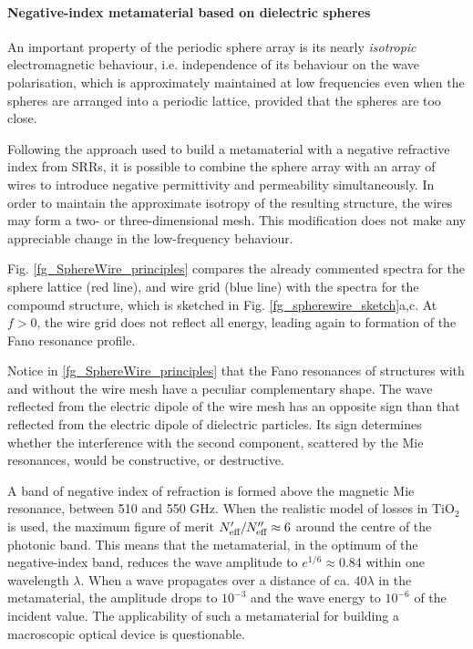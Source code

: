 \paragraph{Negative-index metamaterial based on dielectric spheres} %
An important property of the periodic sphere array is its nearly \textit{isotropic} electromagnetic behaviour, i.e. independence of its behaviour on the wave polarisation, which is approximately maintained at low frequencies even when the spheres are arranged into a periodic lattice, provided that the spheres are too close. 

Following the approach used to build a metamaterial with a negative refractive index from SRRs, it is possible to combine the sphere array with an array of wires to introduce negative permittivity and permeability simultaneously. In order to maintain the approximate isotropy of the resulting structure, the wires may form a two- or three-dimensional mesh. This modification does not make any appreciable change in the low-frequency behaviour. %

Fig. \ref{fg_SphereWire_principles} compares the already commented spectra for the sphere lattice (red line), and wire grid (blue line) with the spectra for the compound structure, which is sketched in Fig. \ref{fg_spherewire_sketch}a,c. At $f>0$, the wire grid does not reflect all energy, leading again to formation of the Fano resonance profile. 

Notice in \ref{fg_SphereWire_principles} that the Fano resonances of structures with and without the wire mesh have a peculiar complementary shape. The wave reflected from the electric dipole of the wire mesh has an opposite sign than that reflected from the electric dipole of dielectric particles. Its sign determines whether the interference with the second component, scattered by the Mie resonances, would be constructive, or destructive. 

A band of negative index of refraction is formed above the magnetic Mie resonance, between 510 and 550 GHz. When the realistic model of losses in TiO$_2$ is used, the maximum figure of merit $N_{\text{eff} }'/N_{\text{eff} }'' \approx 6$ around the centre of the photonic band. This means that the metamaterial, in the optimum of the negative-index band, reduces the wave amplitude to $e^{1/6} \approx 0.84$ within one wavelength $\lambda$. 
When a wave propagates over a distance of ca. $40\lambda$ in the metamaterial, the amplitude drops to $10^{-3}$ and the wave energy to $10^{-6}$ of the incident value. The applicability of such a metamaterial for building a macroscopic optical device is questionable. %

